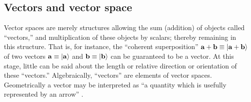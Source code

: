\subsection{Vectors and vector space}

Vector spaces are merely structures allowing the
sum (addition) of objects called ``vectors,'' and multiplication
of these objects by scalars; thereby remaining in this structure.
That is, for instance, the ``coherent superposition''  ${\bf a} + {\bf b}\equiv \vert {\bf a} + {\bf b} \rangle $
of two vectors ${\bf a} \equiv \vert {\bf a} \rangle $ and ${\bf b} \equiv \vert {\bf b} \rangle $ can be guaranteed to
be a vector.
At this stage, little can be said about the length or relative direction or orientation of these ``vectors.''
Algebraically, ``vectors'' are elements of vector spaces.
Geometrically a vector may be interpreted as ``a quantity which is usefully represented by an arrow'' \cite{Weinreich}.



